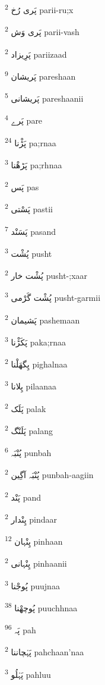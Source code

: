 \documentclass[12pt]{article}
\begin{document}
\begin{RTL}
\begin{multicols}{5}
{\ur پَری رُخ}   \textsuperscript{2} parii-ru;x

{\ur پَری وَش}   \textsuperscript{2} parii-vash

{\ur پَرِیزاد}   \textsuperscript{2} pariizaad

{\ur پَریشان}   \textsuperscript{9} pareshaan

{\ur پَریشانی}   \textsuperscript{5} pareshaanii

{\ur پَرے}   \textsuperscript{4} pare

{\ur پَڑْنا}   \textsuperscript{24} pa;rnaa

{\ur پَڑھْنا}   \textsuperscript{3} pa;rhnaa

{\ur پَس}   \textsuperscript{2} pas

{\ur پَسْتی}   \textsuperscript{2} pastii

{\ur پَسَنْد}   \textsuperscript{7} pasand

{\ur پُشْت}   \textsuperscript{3} pusht

{\ur پُشْت خار}   \textsuperscript{2} pusht-;xaar

{\ur پُشْت گَرْمی}   \textsuperscript{3} pusht-garmii

{\ur پَشیمان}   \textsuperscript{2} pashemaan

{\ur پَکَڑْنا}   \textsuperscript{3} paka;rnaa

{\ur پِگھَلْنا}   \textsuperscript{2} pighalnaa

{\ur پِلانا}   \textsuperscript{3} pilaanaa

{\ur پَلَک}   \textsuperscript{2} palak

{\ur پَلَنْگ}   \textsuperscript{2} palang

{\ur پُنْبَہ}   \textsuperscript{6} punbah

{\ur پُنْبَہ آگِین}   \textsuperscript{2} punbah-aagiin

{\ur پَنْد}   \textsuperscript{2} pand

{\ur پِنْدار}   \textsuperscript{2} pindaar

{\ur پِنْہان}   \textsuperscript{12} pinhaan

{\ur پِنْہانی}   \textsuperscript{2} pinhaanii

{\ur پُوجْنا}   \textsuperscript{3} puujnaa

{\ur پُوچھْنا}   \textsuperscript{38} puuchhnaa

{\ur پَہ}   \textsuperscript{96} pah

{\ur پَہْچاننا}   \textsuperscript{2} pahchaan'naa

{\ur پَہْلُو}   \textsuperscript{3} pahluu


\end{multicols}
\end{RTL}
\end{document}
